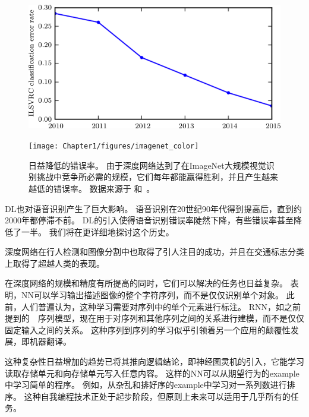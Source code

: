 \begin{figure}[!htb]
\ifOpenSource
\centerline{\includegraphics[scale=0.5]{images/12.png}}
\else
\centerline{\texttt{[image: Chapter1/figures/imagenet\_color]}}
\fi
\caption{日益降低的错误率。
由于深度网络达到了在ImageNet大规模视觉识别挑战中竞争所必需的规模，它们每年都能赢得胜利，并且产生越来越低的错误率。
数据来源于 \citet{Russakovsky2014imagenet}和~\citet{He-et-al-arxiv2015}。}
\label{fig:chap1_imagenet_color}
\end{figure}


\gls{DL}也对语音识别产生了巨大影响。
语音识别在20世纪90年代得到提高后，直到约2000年都停滞不前。
\gls{DL}的引入\citep{dahl2010phonerec,Deng-2010,Seide2011,Hinton-et-al-2012}使得语音识别错误率陡然下降，有些错误率甚至降低了一半。
我们将在更详细地探讨这个历史。

深度网络在行人检测和图像分割中也取得了引人注目的成功\citep{sermanet-cvpr-13,Farabet-et-al-2013,couprie-iclr-13}，并且在交通标志分类上取得了超越人类的表现\citep{Ciresan-et-al-2012}。

在深度网络的规模和精度有所提高的同时，它们可以解决的任务也日益复杂。
\citet{Goodfellow+et+al-ICLR2014a}表明，\gls{NN}可以学习输出描述图像的整个字符序列，而不是仅仅识别单个对象。
此前，人们普遍认为，这种学习需要对序列中的单个元素进行标注\citep{gulcehre_knowledge_2016}。
\gls{RNN}，如之前提到的~~序列模型，现在用于对序列和其他序列之间的关系进行建模，而不是仅仅固定输入之间的关系。
这种序列到序列的学习似乎引领着另一个应用的颠覆性发展，即机器翻译\citep{Sutskever-et-al-NIPS2014,Bahdanau-et-al-ICLR2015-small}。


这种复杂性日益增加的趋势已将其推向逻辑结论，即神经图灵机\citep{Graves-et-al-arxiv2014}的引入，它能学习读取存储单元和向存储单元写入任意内容。
这样的\gls{NN}可以从期望行为的\gls{example}中学习简单的程序。
例如，从杂乱和排好序的\gls{example}中学习对一系列数进行排序。
这种自我编程技术正处于起步阶段，但原则上未来可以适用于几乎所有的任务。



